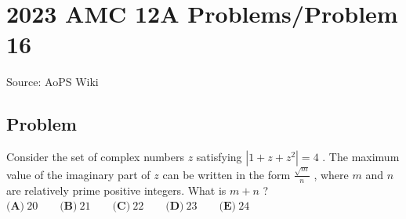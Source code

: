 \documentclass[12pt]{article}
\begin{document}
\section*{{2023 AMC 12A Problems/Problem 16}}
Source: AoPS Wiki

\subsection*{Problem}
Consider the set of complex numbers $z$ satisfying $|1+z+z^{2}|=4$ . The maximum value of the imaginary part of $z$ can be written in the form $\tfrac{\sqrt{m}}{n}$ , where $m$ and $n$ are relatively prime positive integers. What is $m+n$ ? $\textbf{(A)}~20\qquad\textbf{(B)}~21\qquad\textbf{(C)}~22\qquad\textbf{(D)}~23\qquad\textbf{(E)}~24$
\end{document}
